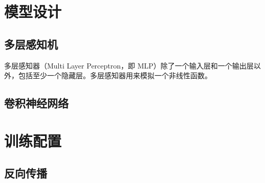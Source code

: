 
\section{模型设计}

    \subsection{多层感知机}
    多层感知器（Multi Layer Perceptron，即 MLP）除了一个输入层和一个输出层以外，包括至少一个隐藏层。多层感知器用来模拟一个非线性函数。


    \subsection{卷积神经网络}

    

\section{训练配置}


    \subsection{反向传播}

